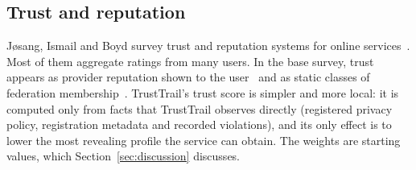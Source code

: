 \subsection{Trust and reputation}
Jøsang, Ismail and Boyd survey trust and reputation systems for online services~\cite{josang2007survey}. Most of them aggregate ratings from many users. In the base survey, trust appears as provider reputation shown to the user~\cite{werner2016model} and as static classes of federation membership~\cite{ferdous2015dynamic}. TrustTrail's trust score is simpler and more local: it is computed only from facts that TrustTrail observes directly (registered privacy policy, registration metadata and recorded violations), and its only effect is to lower the most revealing profile the service can obtain. The weights are starting values, which Section~\ref{sec:discussion} discusses.

